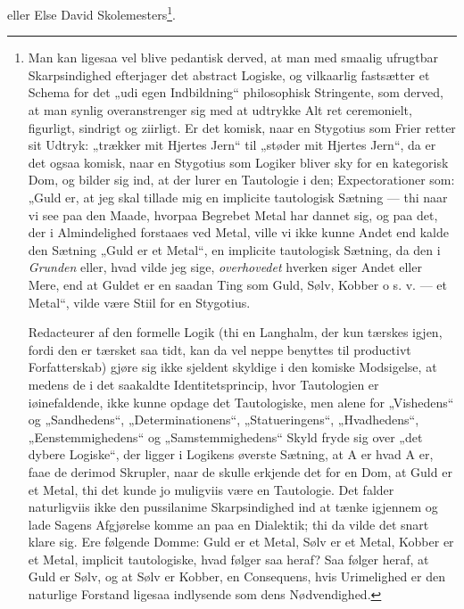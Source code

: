 \documentclass[12pt]{book}
\begin{document}
eller Else David Skolemesters\footnote{%
Man kan ligesaa vel blive pedantisk derved, at man med smaalig
ufrugtbar Skarpsindighed efterjager det abstract Logiske, og vilkaarlig
fastsætter et Schema for det „udi egen Indbildning“ philosophisk
Stringente, som derved, at man synlig overanstrenger sig med at
udtrykke Alt ret ceremonielt, figurligt, sindrigt og ziirligt. Er det
komisk, naar en Stygotius som Frier retter sit Udtryk: „trækker
mit Hjertes Jern“ til „støder mit Hjertes Jern“, da er det ogsaa
komisk, naar en Stygotius som Logiker bliver sky for en kategorisk
Dom, og bilder sig ind, at der lurer en Tautologie i den; Expectorationer
som: „Guld er, at jeg skal tillade mig en implicite tautologisk
Sætning --- thi naar vi see paa den Maade, hvorpaa Begrebet
Metal har dannet sig, og paa det, der i Almindelighed forstaaes ved
Metal, ville vi ikke kunne Andet end kalde den Sætning „Guld er et
Metal“, en implicite tautologisk Sætning, da den i \emph{Grunden}
eller, hvad vilde jeg sige, \emph{overhovedet} hverken siger Andet eller
Mere, end at Guldet er en saadan Ting som Guld, Sølv, Kobber
o s. v. --- et Metal“, vilde være Stiil for en Stygotius.

Redacteurer af den formelle Logik (thi en Langhalm, der kun
tærskes igjen, fordi den er tærsket saa tidt, kan da vel neppe benyttes
til productivt Forfatterskab) gjøre sig ikke sjeldent skyldige i den komiske
Modsigelse, at medens de i det saakaldte Identitetsprincip, hvor Tautologien
er iøinefaldende, ikke kunne opdage det Tautologiske, men
alene for „Vishedens“ og „Sandhedens“, „Determinationens“,
„Statueringens“, „Hvadhedens“, „Eenstemmighedens“ og „Samstemmighedens“
Skyld fryde sig over „det dybere Logiske“, der ligger i
Logikens øverste Sætning, at A er hvad A er, faae de derimod
Skrupler, naar de skulle erkjende det for en Dom, at Guld er et
Metal, thi det kunde jo muligviis være en Tautologie. Det falder
naturligviis ikke den pussilanime Skarpsindighed ind at tænke
igjennem og lade Sagens Afgjørelse komme an paa en Dialektik;
thi da vilde det snart klare sig. Ere følgende Domme: Guld er
et Metal, Sølv er et Metal, Kobber er et Metal, implicit tautologiske,
hvad følger saa heraf? Saa følger heraf, at Guld er
Sølv, og at Sølv er Kobber, en Consequens, hvis Urimelighed er
den naturlige Forstand ligesaa indlysende som dens Nødvendighed.}.
\end{document}
